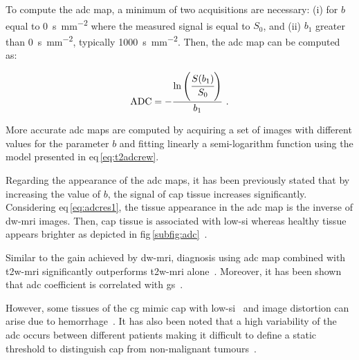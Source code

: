 To compute the \ac{adc} map, a minimum of two acquisitions are necessary: (i)
for $b$ equal to \SI{0}{\second\per\milli\metre\squared} where the measured
signal is equal to $S_0$, and (ii) $b_1$ greater than
\SI{0}{\second\per\milli\metre\squared}, typically
\SI{1000}{\second\per\milli\metre\squared}.
Then, the \ac{adc} map can be computed as:

\begin{equation}
  \text{ADC} = - \frac{\ln \left( \cfrac{S(b_1)}{S_0} \right) }{b_1} \ .
  \label{eq:adcres1}
\end{equation}

More accurate \ac{adc} maps are computed by acquiring a set of images with
different values for the parameter $b$ and fitting linearly a semi-logarithm
function using the model presented in \acs{eq}\,\eqref{eq:t2adcrew}.

Regarding the appearance of the \ac{adc} maps, it has been previously stated
that by increasing the value of $b$, the signal of \ac{cap} tissue increases
significantly.
Considering \acs{eq}\,\eqref{eq:adcres1}, the tissue appearance in the \ac{adc}
map is the inverse of \ac{dw}-\ac{mri} images.
Then, \ac{cap} tissue is associated with low-\ac{si} whereas healthy tissue
appears brighter as depicted in
\acs{fig}\,\ref{subfig:adc}~\cite{Barentsz2012}.

Similar to the gain achieved by \ac{dw}-\ac{mri}, diagnosis using \ac{adc} map
combined with \ac{t2w}-\ac{mri} significantly outperforms \ac{t2w}-\ac{mri}
alone~\cite{Doo2012,Choi2007}.
Moreover, it has been shown that \ac{adc} coefficient is correlated with
\ac{gs}~\cite{Hambrock2011,Itou2011,Peng2013}.

However, some tissues of the \ac{cg} mimic \ac{cap} with
low-\ac{si}~\cite{Kirkham2006} and image distortion can arise due to
hemorrhage~\cite{Choi2007}.
It has also been noted that a high variability of the \ac{adc} occurs between
different patients making it difficult to define a static threshold to
distinguish \ac{cap} from non-malignant tumours~\cite{Choi2007}.

